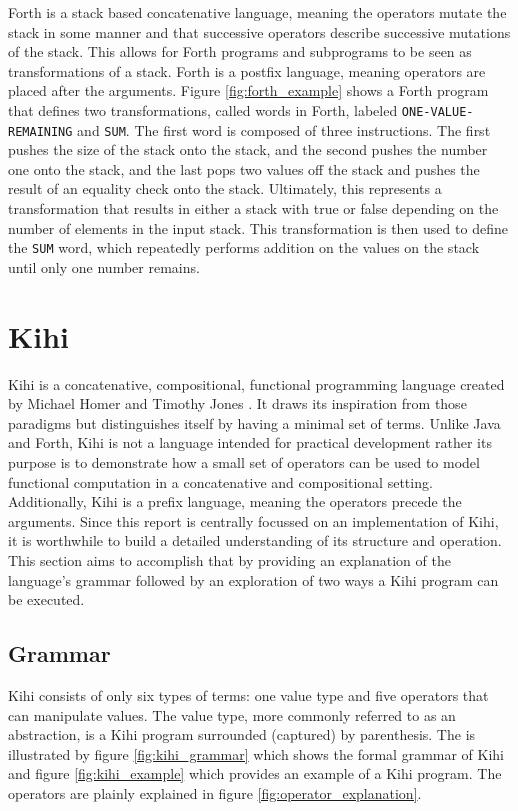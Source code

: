 Forth is a stack based concatenative language, meaning the operators mutate the stack in some manner and that successive operators describe successive mutations of the stack. This allows for Forth programs and subprograms to be seen as transformations of a stack. Forth is a postfix language, meaning operators are placed after the arguments. Figure \ref{fig:forth_example} shows a Forth program that defines two transformations, called words in Forth, labeled \lstinline{ONE-VALUE-REMAINING} and \lstinline{SUM}. The first word is composed of three instructions. The first pushes the size of the stack onto the stack, and the second pushes the number one onto the stack, and the last pops two values off the stack and pushes the result of an equality check onto the stack. Ultimately, this represents a transformation that results in either a stack with true or false depending on the number of elements in the input stack. This transformation is then used to define the \lstinline{SUM} word, which repeatedly performs addition on the values on the stack until only one number remains.



\section{Kihi}
Kihi is a concatenative, compositional, functional programming language created by Michael Homer and Timothy Jones \cite{jones2018practice}. It draws its inspiration from those paradigms but distinguishes itself by having a minimal set of terms. Unlike Java and Forth, Kihi is not a language intended for practical development rather its purpose is to demonstrate how a small set of operators can be used to model functional computation in a concatenative and compositional setting. Additionally, Kihi is a prefix language, meaning the operators precede the arguments. Since this report is centrally focussed on an implementation of Kihi, it is worthwhile to build a detailed understanding of its structure and operation. This section aims to accomplish that by providing an explanation of the language's grammar followed by an exploration of two ways a Kihi program can be executed.




\subsection{Grammar}
Kihi consists of only six types of terms: one value type and five operators that can manipulate values. The value type, more commonly referred to as an abstraction, is a Kihi program surrounded (captured) by parenthesis. The is illustrated by figure \ref{fig:kihi_grammar} which shows the formal grammar of Kihi and figure \ref{fig:kihi_example} which provides an example of a Kihi program. The operators are plainly explained in figure \ref{fig:operator_explanation}.

